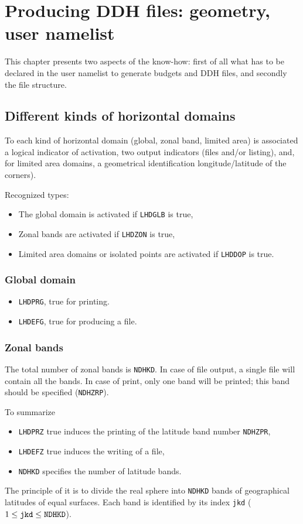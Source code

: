 \chapter{Producing DDH files: geometry, user namelist}

\null
\vspace{1cm}

This chapter presents two aspects of the know-how: first of all what has to be declared in the user namelist to generate budgets and DDH files, and secondly the file structure. 
 
\section{Different kinds of horizontal domains}

To each kind of horizontal domain (global, zonal band, limited area) is associated a logical indicator of activation, two output indicators (files and/or listing), and, for limited area domains, a geometrical identification longitude/latitude of the corners).

Recognized types:  
\begin{itemize}
\item The global domain is activated if {\tt LHDGLB} is true,
\item Zonal bands are activated if {\tt LHDZON} is true,
\item Limited area domains or isolated points are activated if {\tt LHDDOP} is true. 
\end{itemize}

\subsection{Global domain}
 
\begin{itemize}
\item {\tt LHDPRG}, true for printing.
\item {\tt LHDEFG}, true for producing a file.
\end{itemize}
\subsection{Zonal bands }
The total number of zonal bands is {\tt NDHKD}. In case of file output, a single file will contain all the bands. In case of print, only one band will be printed; this band should be specified ({\tt NDHZRP}). 

To summarize
\begin{itemize}
\item {\tt LHDPRZ} true induces the printing of the latitude band number {\tt NDHZPR},
\item {\tt LHDEFZ} true induces the writing of a file,
\item {\tt NDHKD} specifies the number of latitude bands.
\end{itemize}
 The principle of it is to divide the real sphere into {\tt NDHKD} bands of geographical latitudes of equal surfaces. Each band is identified by its index {\tt jkd} ($1 \leq {\tt jkd} \leq {\tt NDHKD}$).


